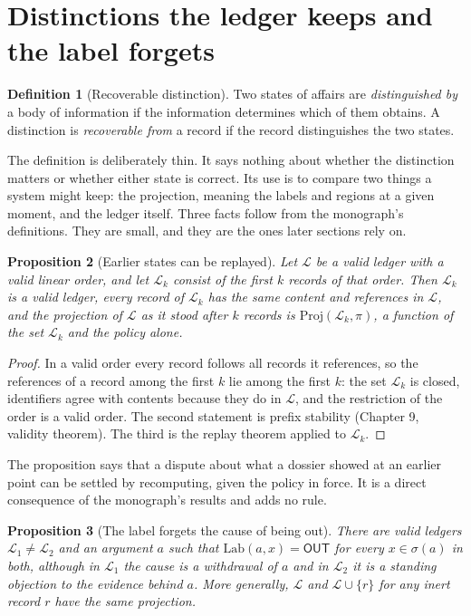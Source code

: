 \documentclass[11pt]{article}
\theoremstyle{plain}
\newtheorem{proposition}{Proposition}
\theoremstyle{definition}
\newtheorem{definition}[proposition]{Definition}
\theoremstyle{remark}
\newcommand{\OUT}{\textsf{OUT}}
\newcommand{\Lab}{\mathrm{Lab}}
\newcommand{\Proj}{\mathrm{Proj}}
\newcommand{\ledger}{\mathcal{L}}
\newcommand{\policy}{\pi}
\begin{document}
\section{Distinctions the ledger keeps and the label forgets}\label{sec:recov}

\begin{definition}[Recoverable distinction]\label{def:recov}
Two states of affairs are \emph{distinguished by} a body of information if the information determines which of them obtains. A distinction is \emph{recoverable from} a record if the record distinguishes the two states.
\end{definition}

The definition is deliberately thin. It says nothing about whether the distinction matters or whether either state is correct. Its use is to compare two things a system might keep: the projection, meaning the labels and regions at a given moment, and the ledger itself. Three facts follow from the monograph's definitions. They are small, and they are the ones later sections rely on.

\begin{proposition}[Earlier states can be replayed]\label{prop:prefix}
Let $\ledger$ be a valid ledger with a valid linear order, and let $\ledger_k$ consist of the first $k$ records of that order. Then $\ledger_k$ is a valid ledger, every record of $\ledger_k$ has the same content and references in $\ledger$, and the projection of $\ledger$ as it stood after $k$ records is $\Proj(\ledger_k,\policy)$, a function of the set $\ledger_k$ and the policy alone.
\end{proposition}

\begin{proof}
In a valid order every record follows all records it references, so the references of a record among the first $k$ lie among the first $k$: the set $\ledger_k$ is closed, identifiers agree with contents because they do in $\ledger$, and the restriction of the order is a valid order. The second statement is prefix stability (Chapter 9, validity theorem). The third is the replay theorem applied to $\ledger_k$.
\end{proof}

The proposition says that a dispute about what a dossier showed at an earlier point can be settled by recomputing, given the policy in force. It is a direct consequence of the monograph's results and adds no rule.

\begin{proposition}[The label forgets the cause of being out]\label{prop:forget}
There are valid ledgers $\ledger_1\ne\ledger_2$ and an argument $a$ such that $\Lab(a,x)=\OUT$ for every $x\in\sigma(a)$ in both, although in $\ledger_1$ the cause is a withdrawal of $a$ and in $\ledger_2$ it is a standing objection to the evidence behind $a$. More generally, $\ledger$ and $\ledger\cup\{r\}$ for any inert record $r$ have the same projection.
\end{proposition}
\end{document}

